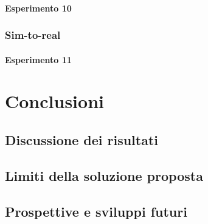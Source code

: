 \documentclass[12pt]{report}
\begin{document}
\subsubsection{Esperimento 10}
\label{sec:esperimento_10}



\subsection{Sim-to-real}
\label{sec:sim_to_real_fr}

\subsubsection{Esperimento 11}
\label{sec:esperimento_11}

\chapter{Conclusioni}
\label{chap:conclusioni}

\section{Discussione dei risultati}
\label{sec:discussione_risultati}

\section{Limiti della soluzione proposta}
\label{sec:limiti}

\section{Prospettive e sviluppi futuri}
\label{sec:prospettive}

\beforebibliography



\closingpage
\end{document}
